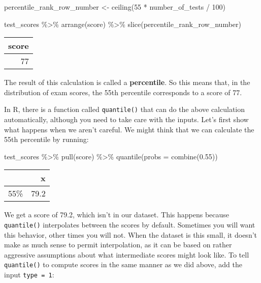 \documentclass[
]{book}
\newenvironment{Shaded}{\begin{snugshade}}{\end{snugshade}}
\newcommand{\AttributeTok}[1]{\textcolor[rgb]{0.77,0.63,0.00}{#1}}
\newcommand{\DecValTok}[1]{\textcolor[rgb]{0.00,0.00,0.81}{#1}}
\newcommand{\FloatTok}[1]{\textcolor[rgb]{0.00,0.00,0.81}{#1}}
\newcommand{\FunctionTok}[1]{\textcolor[rgb]{0.00,0.00,0.00}{#1}}
\newcommand{\NormalTok}[1]{#1}
\newcommand{\OtherTok}[1]{\textcolor[rgb]{0.56,0.35,0.01}{#1}}
\newcommand{\SpecialCharTok}[1]{\textcolor[rgb]{0.00,0.00,0.00}{#1}}
\begin{document}
\begin{Shaded}
\begin{Highlighting}[]
\NormalTok{percentile\_rank\_row\_number }\OtherTok{\textless{}{-}} \FunctionTok{ceiling}\NormalTok{(}\DecValTok{55} \SpecialCharTok{*}\NormalTok{ number\_of\_tests }\SpecialCharTok{/} \DecValTok{100}\NormalTok{)}

\NormalTok{test\_scores }\SpecialCharTok{\%\textgreater{}\%}
  \FunctionTok{arrange}\NormalTok{(score) }\SpecialCharTok{\%\textgreater{}\%}
  \FunctionTok{slice}\NormalTok{(percentile\_rank\_row\_number)}
\end{Highlighting}
\end{Shaded}

\begin{table}
\centering
\begin{tabular}{r}
\hline
score\\
\hline
77\\
\hline
\end{tabular}
\end{table}

The result of this calculation is called a \textbf{percentile}.
So this means that, in the distribution of exam scores, the 55th percentile corresponds to a score of 77.

In R, there is a function called \texttt{quantile()} that can do the above calculation automatically, although you need to take care with the inputs.
Let's first show what happens when we aren't careful.
We might think that we can calculate the 55th percentile by running:

\begin{Shaded}
\begin{Highlighting}[]
\NormalTok{test\_scores }\SpecialCharTok{\%\textgreater{}\%}
  \FunctionTok{pull}\NormalTok{(score) }\SpecialCharTok{\%\textgreater{}\%}
  \FunctionTok{quantile}\NormalTok{(}\AttributeTok{probs =} \FunctionTok{combine}\NormalTok{(}\FloatTok{0.55}\NormalTok{))}
\end{Highlighting}
\end{Shaded}

\begin{table}
\centering
\begin{tabular}{l|r}
\hline
  & x\\
\hline
55\% & 79.2\\
\hline
\end{tabular}
\end{table}

We get a score of 79.2, which isn't in our dataset.
This happens because \texttt{quantile()} interpolates between the scores by default.
Sometimes you will want this behavior, other times you will not.
When the dataset is this small, it doesn't make as much sense to permit interpolation, as it can be based on rather aggressive assumptions about what intermediate scores might look like.
To tell \texttt{quantile()} to compute scores in the same manner as we did above, add the input \texttt{type\ =\ 1}:
\end{document}
